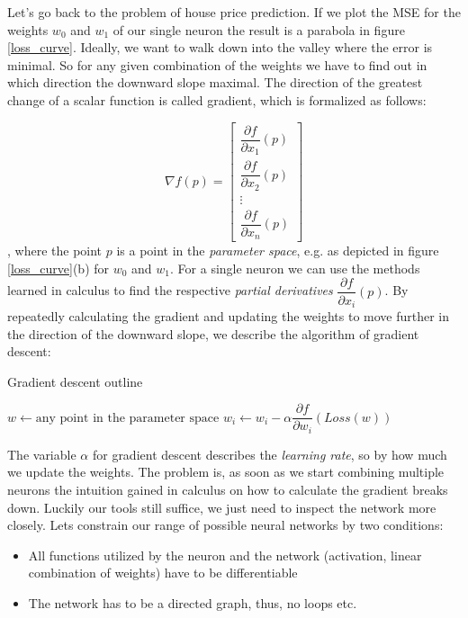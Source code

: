 Let's go back to the problem of house price prediction. If we plot the MSE for the weights $ w_0 $ and $ w_1 $ of our single neuron the result is a parabola in figure \ref{loss_curve}. Ideally, we want to walk down into the valley where the error is minimal. So for any given combination of the weights we have to find out in which direction the downward slope maximal. The direction of the greatest change of a scalar function is called gradient, which is formalized as follows:

$$
    \nabla f(p)=\left[\begin{array}{c}
            \dfrac{\partial f}{\partial x_1}(p) \\
            \dfrac{\partial f}{\partial x_2}(p) \\
            \vdots                              \\
            \dfrac{\partial f}{\partial x_n}(p)
        \end{array}\right]
$$,
where the point $p $ is a point in the \textit{parameter space}, e.g. as depicted in figure \ref{loss_curve}(b) for $w_0 $ and $ w_1 $. For a single neuron we can use the methods learned in calculus to find the respective \textit{partial derivatives} $  \dfrac{\partial f}{\partial x_i}(p) $. By repeatedly calculating the gradient and updating the weights to move further in the direction of the downward slope, we describe the algorithm of gradient descent:

\begin{algorithm}
    \caption{Gradient descent outline \cite[p. 1253]{russell_artificial_2021}}\label{alg:gradient_descent}
    \begin{algorithmic}
        \State $w \gets \text{any point in the parameter space}$
        \State $w_i \gets w_i - \alpha \dfrac{\partial f}{\partial w_i}(Loss(w))$
        \EndFor
        \EndWhile
    \end{algorithmic}
\end{algorithm}

The variable $ \alpha $ for gradient descent describes the \textit{learning rate}, so by how much we update the weights. The problem is, as soon as we start combining multiple neurons the intuition gained in calculus on how to calculate the gradient breaks down. Luckily our tools still suffice, we just need to inspect the network more closely. Lets constrain our range of possible neural networks by two conditions:

\begin{itemize}
    \item All functions utilized by the neuron and the network (activation, linear combination of weights) have to be differentiable
    \item The network has to be a directed graph, thus, no loops etc.
\end{itemize}

